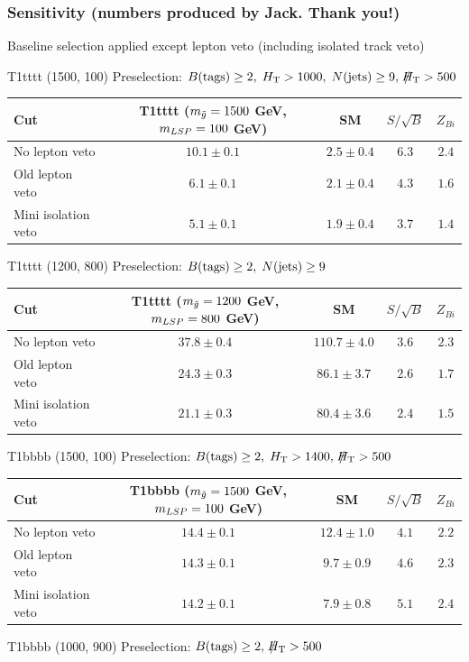 \documentclass{beamer}
\begin{document}
\begin{frame}
 \frametitle{Sensitivity (numbers produced by Jack. Thank you!)}

\small Baseline selection applied except lepton veto (including isolated track veto)
 \Tiny
 \begin{center}
 \Tiny
T1tttt (1500, 100) Preselection: $B(\text{tags})\geq2,\;H_{\text{T}}>1000,\;N(\text{jets})\geq9,\;\slash\mkern-12mu{H}_{\text{T}}>500$

  \begin{tabular}{lcccc}
    \hline
    \hline
    Cut & T1tttt ($m_{\tilde{g}}=1500$ GeV, $m_{LSP}=100$ GeV) & SM & $S/\sqrt{B}$ & $Z_{Bi}$ \\ \hline
No lepton veto & $10.1 \pm 0.1$ & $2.5 \pm 0.4$ &  $6.3$ & $2.4$  \\\hline
Old lepton veto & $6.1 \pm 0.1$ & $2.1 \pm 0.4$ &  $4.3$ & $1.6$  \\
Mini isolation veto & $5.1 \pm 0.1$ & $1.9 \pm 0.4$ &  $3.7$ & $1.4$  \\
    \hline
    \hline
  \end{tabular}
  \end{center}
 
  \begin{center}
 \Tiny T1tttt (1200, 800) Preselection: $B(\text{tags})\geq2,\;N(\text{jets})\geq9$

 \begin{tabular}{lcccc}
    \hline
    \hline
    Cut & T1tttt ($m_{\tilde{g}}=1200$ GeV, $m_{LSP}=800$ GeV) & SM & $S/\sqrt{B}$ & $Z_{Bi}$ \\ \hline
No lepton veto & $37.8 \pm 0.4$ & $110.7 \pm 4.0$ &  $3.6$ & $2.3$  \\\hline
Old lepton veto & $24.3 \pm 0.3$ & $86.1 \pm 3.7$ &  $2.6$ & $1.7$  \\
Mini isolation veto & $21.1 \pm 0.3$ & $80.4 \pm 3.6$ &  $2.4$ & $1.5$  \\
    \hline
    \hline
  \end{tabular}
   \end{center}
   
  \begin{center}
 \Tiny T1bbbb (1500, 100) Preselection: $B(\text{tags})\geq2,\;H_{\text{T}}>1400,\;\slash\mkern-12mu{H}_{\text{T}}>500$

 \begin{tabular}{lcccc}
    \hline
    \hline
    Cut & T1bbbb ($m_{\tilde{g}}=1500$ GeV, $m_{LSP}=100$ GeV) & SM &  $S/\sqrt{B}$ & $Z_{Bi}$ \\ \hline
No lepton veto & $14.4 \pm 0.1$ & $12.4 \pm 1.0$ &  $4.1$ & $2.2$  \\\hline
Old lepton veto & $14.3 \pm 0.1$ & $9.7 \pm 0.9$ &  $4.6$ & $2.3$  \\
Mini isolation veto & $14.2 \pm 0.1$ & $7.9 \pm 0.8$ &  $5.1$ & $2.4$  \\
    \hline
    \hline
  \end{tabular}
 \end{center}
  \begin{center}
 \Tiny T1bbbb (1000, 900) Preselection: $B(\text{tags})\geq2,\;\slash\mkern-12mu{H}_{\text{T}}>500$



\end{center}
\end{frame}
\end{document}

